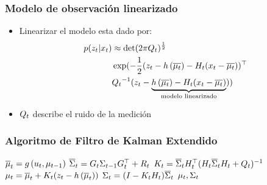 \begin{frame}
	\frametitle{Modelo de observación linearizado}
	
	\begin{itemize}
		\item Linearizar el modelo esta dado por:
		\begin{align*}
			p(z_{t} | x_{t}) &\approx \det(2 \pi Q_{t})^{\frac{1}{2}}\\
			&\exp (-\dfrac{1}{2} (z_{t} - h\left( \overline{\mu_{t}} \right) - H_{t}(x_{t} - \overline{\mu_{t}}))^{\top}\\
			&{Q_{t}}^{-1} (z_{t} - \underbrace{h\left( \overline{\mu_{t}} \right) - H_{t} (x_{t}-\overline{\mu_{t}})}_{\text{modelo linearizado}}))
		\end{align*}
		
		\item $Q_{t}$ describe el ruido de la medición
	\end{itemize}	
	
	
\end{frame}

\begin{frame}
	\frametitle{Algoritmo de Filtro de Kalman Extendido}
	
    \begin{algorithmic}[1]
        \State $\overline{\mu}_{t} = g\left( u_{t}, \mu_{t-1} \right)$
        \State $\overline{\Sigma}_{t} = G_{t} \Sigma_{t-1} G_{t}^{\top}+R_{t}$
        \Statex
        \State $K_{t} = \overline{\Sigma}_{t} H_{t}^{\top} (H_{t} \overline{\Sigma}_{t}  H_{t} + Q_{t})^{-1} $
        \State $\mu_{t} = \overline{\mu}_{t} + K_{t} (z_{t} - h\left( \overline{\mu}_{t} \right))$
        \State $\Sigma_{t} =  (I - K_{t} H_{t}) \overline{\Sigma}_{t}$
        \State \Return $\mu_{t}, \Sigma_{t}$
    \EndProcedure
    \end{algorithmic}
\end{frame}

